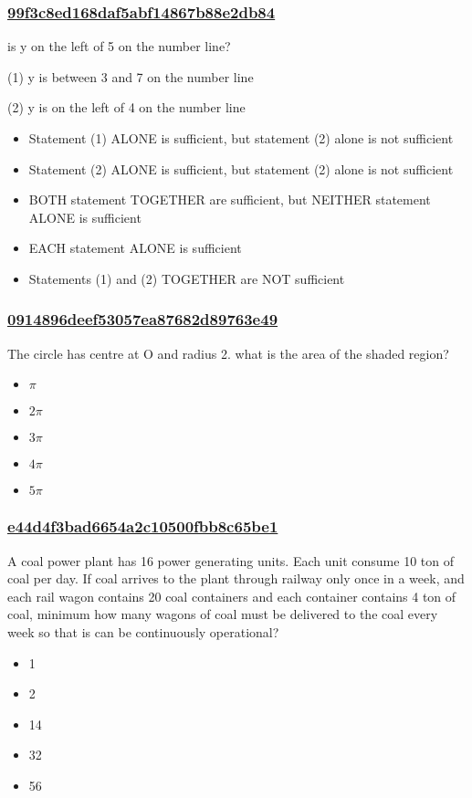 \documentclass[]{beamer}
\begin{document}
\begin{frame}
    \frametitle{\underline{99f3c8ed168daf5abf14867b88e2db84}}
    is y on the left of 5 on the number line?\par
(1) y is between 3 and 7 on the number line\par
(2) y is on the left of 4 on the number  line    
    \begin{itemize}
        \item
            Statement (1) ALONE is sufficient, but statement (2) alone is not sufficient
        \item
            Statement (2) ALONE is sufficient, but statement (2) alone is not sufficient
        \item
            BOTH statement TOGETHER are sufficient, but NEITHER statement ALONE is sufficient
        \item
            EACH statement ALONE is sufficient
        \item
            Statements (1) and (2) TOGETHER are NOT sufficient
    \end{itemize}
\end{frame}

\begin{frame}
    \frametitle{\underline{0914896deef53057ea87682d89763e49}}
    The circle has centre at O and radius 2. what is the area of the shaded region?    
    \begin{itemize}
        \item
            $\pi$
        \item
            $2\pi$
        \item
            $3\pi$
        \item
            $4\pi$
        \item
            $5\pi$
    \end{itemize}
\end{frame}

\begin{frame}
    \frametitle{\underline{e44d4f3bad6654a2c10500fbb8c65be1}}
    A coal power plant has 16 power generating units. Each unit consume 10 ton of coal per day. If coal arrives to the plant through railway only once in a week, and each rail wagon contains 20 coal containers and each container contains 4 ton of coal, minimum how many wagons of coal must be delivered to the coal every week so that is can be continuously operational?    
    \begin{itemize}
        \item
            1
        \item
            2
        \item
            14
        \item
            32
        \item
            56
    \end{itemize}
\end{frame}
\end{document}
